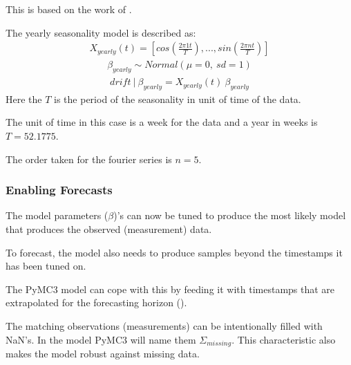 \documentclass[letterpaper,10pt,english]{sphinxmanual}
\begin{document}
This is based on the work of .

The yearly seasonality model is described as:
\begin{equation*}
\begin{split}X_{yearly}(t) = [cos(\frac{2 \pi 1 t}{T}), ..., sin(\frac{2 \pi n t}{T})]\end{split}
\end{equation*}\begin{equation*}
\begin{split}\beta_{yearly} \sim Normal(\mu=0, \:sd=1)\end{split}
\end{equation*}\begin{equation*}
\begin{split}drift\:|\:\beta_{yearly} = X_{yearly}(t)\:\beta_{yearly}\end{split}
\end{equation*}
Here the \(T\) is the period of the seasonality in unit of time of the data.

The unit of time in this case is a week for the data and a year in weeks is \(T=52.1775\).

The order taken for the fourier series is \(n=5\).


\subsubsection{Enabling Forecasts}
\label{\detokenize{modeling:enabling-forecasts}}
The model parameters (\(\beta\))’s can now be tuned to produce the most likely model that produces the observed (measurement) data.

To forecast, the model also needs to produce samples beyond the timestamps it has been tuned on.

The PyMC3 model can cope with this by feeding it with timestamps that are extrapolated for the forecasting horizon ({\hyperref[\detokenize{autoapi/src/preprocess/preprocess/index:src.preprocess.preprocess.extrapolate_timestamps}]{}}).

The matching observations (measurements) can be intentionally filled with NaN’s.
In the model PyMC3 will name them \(\Sigma_{missing}\).
This characteristic also makes the model robust against missing data.
\end{document}
